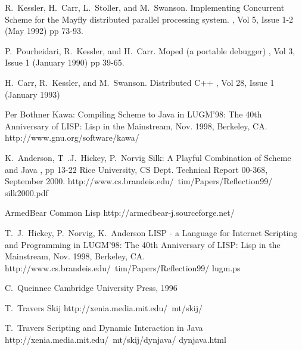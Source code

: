 \documentclass{acm_proc_article-sp}
\begin{document}
\begin{thebibliography}{1}

 R.~Kessler, H.~Carr, L.~Stoller, and M.~Swanson.
\newblock Implementing Concurrent Scheme for the Mayfly distributed
parallel processing system.  , Vol 5, Issue 1-2 (May 1992) pp 73-93.

P.~Pourheidari, R.~Kessler, and H.~Carr.
\newblock Moped (a portable debugger)
, Vol 3, Issue 1 (January 1990) pp 39-65.

H.~Carr, R.~Kessler, and M.~Swanson.
\newblock Distributed C++
, Vol 28, Issue 1 (January 1993)

Per Bothner
\newblock Kawa: Compiling Scheme to Java
\newblock in LUGM'98: The 40th Anniversary of LISP: Lisp in the Mainstream, Nov. 1998, Berkeley, CA.
\newblock http://www.gnu.org/software/kawa/

K.~Anderson, T~.J.~Hickey, P.~Norvig
\newblock Silk: A Playful Combination of Scheme and Java
 , pp 13-22
\newblock Rice University, CS Dept. Technical Report 00-368, September 2000.
\newblock http://www.cs.brandeis.edu/~tim/Papers/Reflection99/ silk2000.pdf

\newblock ArmedBear Common Lisp
\newblock http://armedbear-j.sourceforge.net/


T.~J.~Hickey, P.~Norvig, K.~Anderson
\newblock LISP - a Language for Internet Scripting and Programming
\newblock in LUGM'98: The 40th Anniversary of LISP: Lisp in the Mainstream, Nov. 1998, Berkeley, CA.
\newblock http://www.cs.brandeis.edu/~tim/Papers/Reflection99/ lugm.ps

C.~Queinnec
\newblock Cambridge University Press, 1996

T.~Travers
\newblock Skij
\newblock http://xenia.media.mit.edu/~mt/skij/

T.~Travers
\newblock Scripting and Dynamic Interaction in Java
\newblock http://xenia.media.mit.edu/~mt/skij/dynjava/ dynjava.html


\end{thebibliography}
\end{document}
